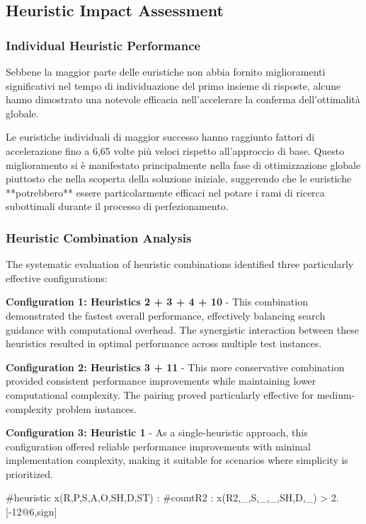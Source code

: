 \documentclass[11pt,a4paper]{article}
\begin{document}
\subsection{Heuristic Impact Assessment}

\subsubsection{Individual Heuristic Performance}

Sebbene la maggior parte delle euristiche non abbia fornito miglioramenti significativi nel tempo di individuazione del primo insieme di risposte, alcune hanno dimostrato una notevole efficacia nell'accelerare la conferma dell'ottimalità globale.

Le euristiche individuali di maggior successo hanno raggiunto fattori di accelerazione fino a 6,65 volte più veloci rispetto all'approccio di base. 
Questo miglioramento si è manifestato principalmente nella fase di ottimizzazione globale piuttosto che nella scoperta della soluzione iniziale, suggerendo che le euristiche **potrebbero** essere particolarmente efficaci nel potare i rami di ricerca subottimali durante il processo di perfezionamento.

\subsubsection{Heuristic Combination Analysis}

The systematic evaluation of heuristic combinations identified three particularly effective configurations:

\textbf{Configuration 1: Heuristics 2 + 3 + 4 + 10} - This combination demonstrated the fastest overall performance, effectively balancing search guidance with computational overhead. The synergistic interaction between these heuristics resulted in optimal performance across multiple test instances.

\textbf{Configuration 2: Heuristics 3 + 11} - This more conservative combination provided consistent performance improvements while maintaining lower computational complexity. The pairing proved particularly effective for medium-complexity problem instances.

\textbf{Configuration 3: Heuristic 1} - As a single-heuristic approach, this configuration offered reliable performance improvements with minimal implementation complexity, making it suitable for scenarios where simplicity is prioritized.

#heuristic 
    x(R,P,S,A,O,SH,D,ST) :  #count{R2 : x(R2,_,S,_,_,SH,D,_)} > 2. 
[-12@6,sign]
\end{document}
